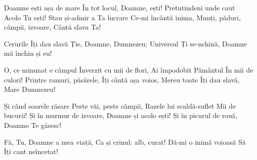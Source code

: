 
\beginverse
Doamne ești așa de mare
În tot locul, Doamne, ești!
Pretutindeni unde caut
Acolo Tu ești!
Stau și-admir a Ta lucrare
Ce-mi încântă inima,
Munți, păduri, câmpii, izvoare,
Cântă slava Ta!
\endverse

\beginchorus
Cerurile Îți dau slavă
Ție, Doamne, Dumnezeu;
Universul Ți se-nchină,
Doamne mă închin și eu!
\endchorus

\beginverse
O, ce minunat e câmpul
Înverzit cu mii de flori,
Ai împodobit Pământul
În mii de culori!
Printre ramuri, păsărele,
Îți cântă așa voios,
Mereu toate Îți dau slavă,
Mare Dumnezeu!
\endverse

\beginverse
Și când soarele răsare
Peste văi, peste câmpii,
Razele lui scaldă-suflet
Mii de bucurii!
Și în murmur de izvoare,
Doamne și acolo ești!
Și în picurul de rouă,
Doamne Te găsesc!
\endverse

\beginchorus
Fă, Tu, Doamne a mea viață,
Ca și crinul: alb, curat!
Dă-mi o inimă voioasă
Să Îți cant neîncetat!
\endchorus

\endsong